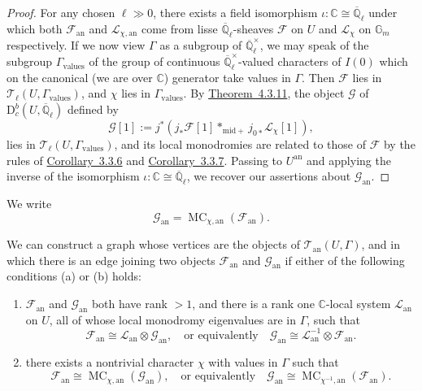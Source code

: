 \begin{proof}
For any chosen \(\ell\gg 0\), there exists a field isomorphism
\(\iota:\mathbb{C}\cong\overline{\mathbb{Q}}_\ell\) under which both
\(\mathcal{F}_{\mathrm{an}}\) and \(\mathcal{L}_{\chi,\mathrm{an}}\) come from
lisse \(\overline{\mathbb{Q}}_\ell\)-sheaves \(\mathcal{F}\) on \(U\) and
\(\mathcal{L}_\chi\) on \(\mathbb{G}_m\) respectively. If we now view
\(\Gamma\) as a subgroup of \(\overline{\mathbb{Q}}_\ell^\times\), we may
speak of the subgroup \(\Gamma_{\mathrm{values}}\) of the group of continuous
\(\overline{\mathbb{Q}}_\ell^\times\)-valued characters of \(I(0)\) which on
the canonical (we are over \(\mathbb{C}\)) generator take values in
\(\Gamma\). Then \(\mathcal{F}\) lies in
\(\mathcal{T}_\ell(U,\Gamma_{\mathrm{values}})\), and \(\chi\) lies in
\(\Gamma_{\mathrm{values}}\). By
\hyperref[thm:4.3.11]{Theorem~4.3.11}, the object \(\mathcal{G}\) of
\(\mathrm{D}^b_c(U,\overline{\mathbb{Q}}_\ell)\) defined by
\[
  \mathcal{G}[1]:=
  j^*(j_*\mathcal{F}[1]*_{\mathrm{mid}+}j_{0*}\mathcal{L}_\chi[1]),
\]
lies in \(\mathcal{T}_\ell(U,\Gamma_{\mathrm{values}})\), and its local
monodromies are related to those of \(\mathcal{F}\) by the rules of
\hyperref[cor:3.3.6]{Corollary~3.3.6} and
\hyperref[cor:3.3.7]{Corollary~3.3.7}. Passing to \(U^{\mathrm{an}}\) and
applying the inverse of the isomorphism
\(\iota:\mathbb{C}\cong\overline{\mathbb{Q}}_\ell\), we recover our assertions
about \(\mathcal{G}_{\mathrm{an}}\).
\end{proof}

We write
\[
  \mathcal{G}_{\mathrm{an}}=\operatorname{MC}_{\chi,\mathrm{an}}
  (\mathcal{F}_{\mathrm{an}}).
\]

We can construct a graph whose vertices are the objects of
\(\mathcal{T}_{\mathrm{an}}(U,\Gamma)\), and in which there is an edge joining
two objects \(\mathcal{F}_{\mathrm{an}}\) and \(\mathcal{G}_{\mathrm{an}}\) if
either of the following conditions (a) or (b) holds:
\begin{enumerate}[label=(\alph*)]
\item \(\mathcal{F}_{\mathrm{an}}\) and \(\mathcal{G}_{\mathrm{an}}\) both
have rank \(>1\), and there is a rank one \(\mathbb{C}\)-local system
\(\mathcal{L}_{\mathrm{an}}\) on \(U\), all of whose local monodromy
eigenvalues are in \(\Gamma\), such that
\[
  \mathcal{F}_{\mathrm{an}}\cong
  \mathcal{L}_{\mathrm{an}}\otimes\mathcal{G}_{\mathrm{an}},
  \quad\text{or equivalently}\quad
  \mathcal{G}_{\mathrm{an}}\cong
  \mathcal{L}_{\mathrm{an}}^{-1}\otimes\mathcal{F}_{\mathrm{an}}.
\]

\item there exists a nontrivial character \(\chi\) with values in \(\Gamma\)
such that
\[
  \mathcal{F}_{\mathrm{an}}\cong
  \operatorname{MC}_{\chi,\mathrm{an}}(\mathcal{G}_{\mathrm{an}}),
  \quad\text{or equivalently}\quad
  \mathcal{G}_{\mathrm{an}}\cong
  \operatorname{MC}_{\chi^{-1},\mathrm{an}}(\mathcal{F}_{\mathrm{an}}).
\]
\end{enumerate}

